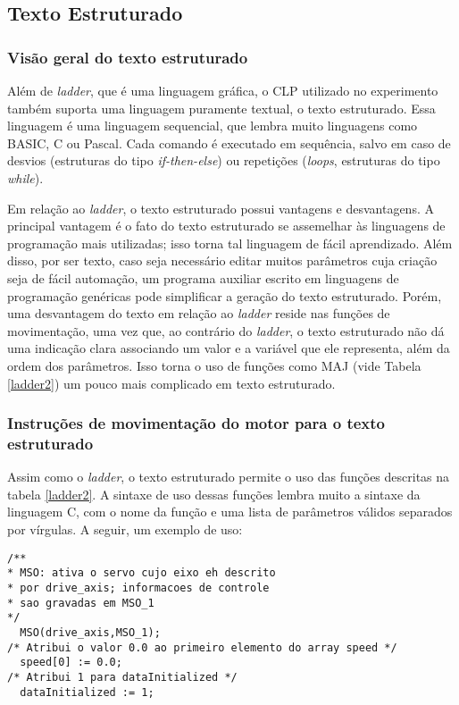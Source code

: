 \subsection{Texto Estruturado}
\subsubsection{Visão geral do texto estruturado}
Além de \textit{ladder}, que é uma linguagem gráfica, o CLP utilizado no experimento também suporta uma linguagem puramente textual, o texto estruturado. Essa linguagem é uma linguagem sequencial, que lembra muito linguagens como BASIC, C ou Pascal. Cada comando é executado em sequência, salvo em caso de desvios (estruturas do tipo \textit{if-then-else}) ou repetições (\textit{loops}, estruturas do tipo \textit{while}).

Em relação ao \textit{ladder}, o texto estruturado possui vantagens e desvantagens. A principal vantagem é o fato do texto estruturado se assemelhar às linguagens de programação mais utilizadas; isso torna tal linguagem de fácil aprendizado. Além disso, por ser texto, caso seja necessário editar muitos parâmetros cuja criação seja de fácil automação, um programa auxiliar escrito em linguagens de programação genéricas pode simplificar a geração do texto estruturado. Porém, uma desvantagem do texto em relação ao \textit{ladder} reside nas funções de movimentação, uma vez que, ao contrário do \textit{ladder}, o texto estruturado não dá uma indicação clara associando um valor e a variável que ele representa, além da ordem dos parâmetros. Isso torna o uso de funções como MAJ (vide Tabela \ref{ladder2}) um pouco mais complicado em texto estruturado.

\subsubsection{Instruções de movimentação do motor para o texto estruturado}
Assim como o \textit{ladder}, o texto estruturado permite o uso das funções descritas na tabela \ref{ladder2}. A sintaxe de uso dessas funções lembra muito a sintaxe da linguagem C, com o nome da função e uma lista de parâmetros válidos separados por vírgulas. A seguir, um exemplo de uso:
 
\begin{lstlisting}
/**
* MSO: ativa o servo cujo eixo eh descrito
* por drive_axis; informacoes de controle
* sao gravadas em MSO_1
*/
  MSO(drive_axis,MSO_1);
/* Atribui o valor 0.0 ao primeiro elemento do array speed */
  speed[0] := 0.0; 
/* Atribui 1 para dataInitialized */
  dataInitialized := 1;
\end{lstlisting}


